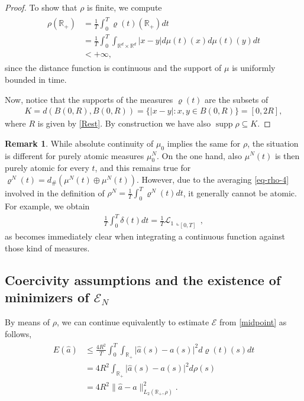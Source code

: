 \documentclass[A4paper,11pt]{article}
\theoremstyle{definition}
\newtheorem{remark}{Remark}
\newcommand{\R}{\mathbb{R}}
\newcommand{\cl}{\mathcal{L}}
\DeclareMathOperator{\supp}{supp}
\begin{document}
\begin{proof}
To show that $\rho$ is finite, we compute
\begin{align*}
\begin{split}
\rho(\R_+)&= \frac{1}{T}\int_0^T \varrho(t)(\R_+)dt \\
&= \frac{1}{T}\int_0^T \int_{\R^d \times \R^d} |x - y| d\mu(t)(x) d \mu(t)(y)dt\\
&<+\infty,
\end{split}
\end{align*}
since the distance function is continuous and the support of $\mu$ is uniformly bounded in time.

	Now, notice that the supports of the measures $\varrho(t)$ are the subsets of
	\begin{align*}
	K=d(B(0,R),B(0,R))=\{|x-y|:x,y\in B(0,R)\} = [0,2R],
	\end{align*}
	where $R$ is given by \eqref{Rest}. By construction we have also
	$\supp\rho\subseteq K$.
\end{proof}

\begin{remark}
	While absolute continuity of $\mu_0$ implies the same for $\rho$, the situation is different for purely atomic
	measures $\mu_0^N$. On the one hand, also $\mu^N(t)$ is then purely atomic for every $t$, and this remains true for
	$\varrho^N(t) = d_\# (\mu^N(t) \oplus \mu^N(t))$. However, due to the averaging \eqref{eq-rho-4} involved in the definition of $\rho^N=\frac{1}{T} \int_0^T \varrho^N(t) dt$, it generally cannot be atomic. For
	example, we obtain
	\begin{align*}
		\frac{1}{T}\int_0^T\delta(t) dt=\frac{1}{T}\cl_1\llcorner_{[0,T]}\,,
	\end{align*}
	as becomes immediately clear when integrating a continuous function against those kind of measures.
\end{remark}

\subsection{Coercivity assumptions and the existence of minimizers of $\mathcal E_N$}

By means of $\rho$, we can continue equivalently to  estimate $\mathcal E$ from \eqref{midpoint} as follows,
\begin{align}
\begin{split}\label{eq-rho-3}
	E(\widehat a)&\leq\frac{4R^2}{T}\int_0^T\int_{\R_+}\bigl|\widehat a(s)-a(s)\bigr|^2 d\varrho(t)(s) dt \\
		&= 4R^2\int_{\R_+} \bigl|\widehat a(s)-a(s)\bigr|^2 d\rho(s)\\
		&= 4R^2\|\widehat a-a\|^2_{L_2(\R_+,\rho)}.
\end{split}
\end{align}
\end{document}
